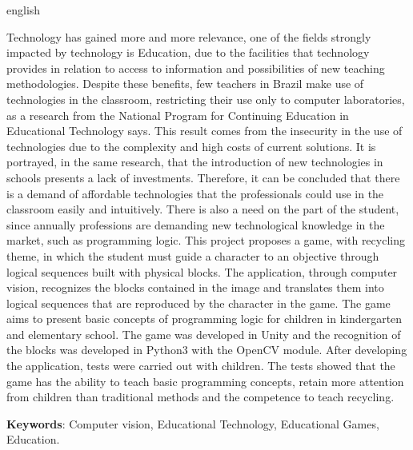      \begin{resumo}[Abstract]
      \begin{otherlanguage*}{english}
 
Technology has gained more and more relevance, one of the fields strongly impacted by technology is Education, due to the facilities that technology provides in relation to access to information and possibilities of new teaching methodologies.
Despite these benefits, few teachers in Brazil make use of technologies in the classroom, restricting their use only to computer laboratories, as a research from the National Program for Continuing Education in Educational Technology says. This result comes from the insecurity in the use of technologies due to the complexity and high costs of current solutions. It is portrayed, in the same research, that the introduction of new technologies in schools presents a lack of investments.
Therefore, it can be concluded that there is a demand of affordable technologies that the professionals could use in the classroom easily and intuitively.
There is also a need on the part of the student, since annually professions are demanding new technological knowledge in the market, such as programming logic.
This project proposes a game, with recycling theme, in which the student must guide a character to an objective through logical sequences built with physical blocks. The application, through computer vision, recognizes the blocks contained in the image and translates them into logical sequences that are reproduced by the character in the game. The game aims to present basic concepts of programming logic for children in kindergarten and elementary school. The game was developed in Unity and the recognition of the blocks was developed in Python3 with the OpenCV module.
After developing the application, tests were carried out with children. The tests showed that the game has the ability to teach basic programming concepts, retain more attention from children than traditional methods and the competence to teach recycling.

   \textbf{Keywords}: Computer vision, Educational Technology, Educational Games, Education.
      \end{otherlanguage*}
    \end{resumo}
